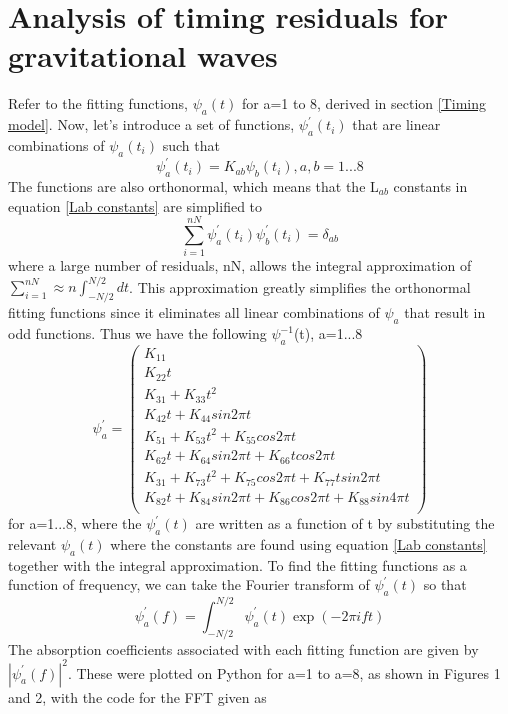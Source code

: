\documentclass[12pt]{article}
\begin{document}
	\section{Analysis of timing residuals for gravitational waves}
	
	Refer to the fitting functions, $\psi_{a}(t)$ for a=1 to 8, derived in section \ref{Timing model}. Now, let's introduce a set of functions, $\psi_{a}^{'}(t_i)$ that are linear combinations of $\psi_a(t_i)$ such that
	\begin{equation}\label{psi'}
	\psi_{a}^{'}(t_i)=K_{ab}\psi_{b}(t_i), a,b=1...8
	\end{equation}
	The functions are also orthonormal, which means that the L$_{ab}$ constants in equation \ref{Lab constants} are simplified to
	\begin{equation}\label{psi'orthonormal}
	\sum_{i=1}^{nN}\psi_{a}^{'}(t_i)\psi_{b}^{'}(t_i)=\delta_{ab}
	\end{equation}
	where a large number of residuals, nN, allows the integral approximation of $\sum_{i=1}^{nN}\approx n\int_{-N/2}^{N/2}dt$. This approximation greatly simplifies the orthonormal fitting functions since it eliminates all linear combinations of $\psi_a$ that result in odd functions.
	Thus we have the following $\psi_{a}^{-1}$(t), a=1...8
	$$
	\psi_{a}^{'}=
	\begin{pmatrix}
	K_{11}\\
	K_{22}t\\
	K_{31}+K_{33}t^2\\
	K_{42}t+K_{44}sin2 \pi t\\
	K_{51}+K_{53}t^2+K_{55}cos2 \pi t\\
	K_{62}t+K_{64}sin2 \pi t+K_{66}t cos2 \pi t\\
	K_{31}+K_{73}t^2+K_{75}cos2 \pi t+K_{77}t sin2 \pi t\\
	K_{82}t+K_{84}sin2 \pi t+K_{86}cos2 \pi t+K_{88}sin4 \pi t\\
	\end{pmatrix}
	$$
	for a=1...8, where the $\psi_{a}^{'}(t)$ are written as a function of t by substituting the relevant $\psi_a(t)$ where the constants are found using equation \ref{Lab constants} together with the integral approximation. 
	To find the fitting functions as a function of frequency, we can take the Fourier transform of $\psi_a^{'}(t)$ so that
	\begin{equation}\label{psi(f)}
	\psi_a^{'}(f)=\int_{-N/2}^{N/2}\psi_a^{'}(t)\exp({-2\pi i f t})
	\end{equation}
	The absorption coefficients associated with each fitting function are given by $|\psi_a^{'}(f)|^2$. These were plotted on Python for a=1 to a=8, as shown in Figures 1 and 2, with the code for the FFT given as\\
	
\end{document}
